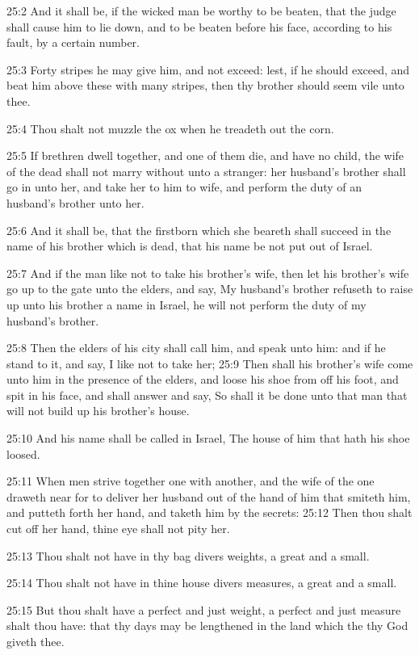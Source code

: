 25:2 And it shall be, if the wicked man be worthy to be beaten, that the judge shall cause him to lie down, and to be beaten before his face, according to his fault, by a certain number.

25:3 Forty stripes he may give him, and not exceed: lest, if he should exceed, and beat him above these with many stripes, then thy brother should seem vile unto thee.

25:4 Thou shalt not muzzle the ox when he treadeth out the corn.

25:5 If brethren dwell together, and one of them die, and have no child, the wife of the dead shall not marry without unto a stranger: her husband's brother shall go in unto her, and take her to him to wife, and perform the duty of an husband's brother unto her.

25:6 And it shall be, that the firstborn which she beareth shall succeed in the name of his brother which is dead, that his name be not put out of Israel.

25:7 And if the man like not to take his brother's wife, then let his brother's wife go up to the gate unto the elders, and say, My husband's brother refuseth to raise up unto his brother a name in Israel, he will not perform the duty of my husband's brother.

25:8 Then the elders of his city shall call him, and speak unto him: and if he stand to it, and say, I like not to take her; 25:9 Then shall his brother's wife come unto him in the presence of the elders, and loose his shoe from off his foot, and spit in his face, and shall answer and say, So shall it be done unto that man that will not build up his brother's house.

25:10 And his name shall be called in Israel, The house of him that hath his shoe loosed.

25:11 When men strive together one with another, and the wife of the one draweth near for to deliver her husband out of the hand of him that smiteth him, and putteth forth her hand, and taketh him by the secrets: 25:12 Then thou shalt cut off her hand, thine eye shall not pity her.

25:13 Thou shalt not have in thy bag divers weights, a great and a small.

25:14 Thou shalt not have in thine house divers measures, a great and a small.

25:15 But thou shalt have a perfect and just weight, a perfect and just measure shalt thou have: that thy days may be lengthened in the land which the \LORD thy God giveth thee.

